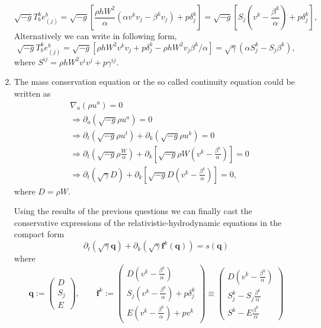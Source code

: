 \documentclass[10pt]{article}
\begin{document}
\begin{enumerate}
\begin{equation}
  \label{eq:flux-kj-first-form}
  \boxed{\sqrt{-g}T^k_b e^b_{(j)} = \sqrt{-g}\left[\frac{\rho h W^2}{\alpha}(\alpha v^k v_j - \beta^k v_j) + p \delta^k_j\right] = \sqrt{-g}\left[S_j\left(v^k - \frac{\beta^k}{\alpha}\right) + p \delta^k_j\right]},
\end{equation}
Alternatively we can write in following form,
\begin{equation}
  \label{eq:flux-kj}
  \boxed{\sqrt{-g}T^k_b e^b_{(j)} = \sqrt{-g}\left[\rho h W^2 v^k v_j + p \delta^k_j - \rho h W^2 v_j \beta^k /\alpha\right] = \sqrt{\gamma}(\alpha S^k_j - S_j \beta^k)},
\end{equation}
where $S^{ij} = \rho h W^2 v^i v^j + p \gamma^{ij}$.
\item The mass conservation equation or the so called continuity equation could be written as
  \begin{align}
    \label{eq:mass-conservation}
    & \nabla_a(\rho u^a) = 0 \\
    & \Rightarrow \partial_a(\sqrt{-g}\rho u^a) = 0 \\
    & \Rightarrow \partial_t(\sqrt{-g}\rho u^t) + \partial_k (\sqrt{-g}\rho u^k) = 0\\
    & \Rightarrow \partial_t(\sqrt{-g}\rho\frac{W}{\alpha}) + \partial_k\left[\sqrt{-g}\rho W \left(v^k - \frac{\beta^k}{\alpha}\right)\right]=0\\
    & \Rightarrow \boxed{\partial_t(\sqrt{\gamma} D) + \partial_k\left[\sqrt{-g} D \left(v^k -\frac{\beta^k}{\alpha}\right)\right] = 0},
  \end{align}
  where $D = \rho W$.

  Using the results of the previous questions we can finally cast the conservative expressions of the relativistic-hydrodynamic equations in the compact form
  \begin{equation}
    \label{eq:conservative-expressions-relativistic-hydrodynamics}
    \partial_t(\sqrt{\gamma} \mathbf{q})+\partial_k (\sqrt{\gamma} \mathbf{f}^k(\mathbf{q})) = s(\mathbf{q})
  \end{equation}
  where
  \begin{equation}
    \label{eq:conservative-variables-and-fluxes}
    \mathbf{q} :=
    \begin{pmatrix}
      D \\
      S_j\\
      E
    \end{pmatrix},\qquad
    \mathbf{f}^k := \begin{pmatrix}
      D \left(v^k -\frac{\beta^k}{\alpha}\right)\\
      S_j\left(v^k - \frac{\beta^k}{\alpha}\right) + p \delta^k_j\\
      E\left(v^k - \frac{\beta^k}{\alpha}\right) + p v^k
    \end{pmatrix}\equiv
    \begin{pmatrix}
      D \left(v^k -\frac{\beta^k}{\alpha}\right)\\
      S^k_j - S_j \frac{\beta^k}{\alpha}\\
      S^k - E \frac{\beta^k}{\alpha}
    \end{pmatrix}
  \end{equation}


\end{enumerate}
\end{document}
